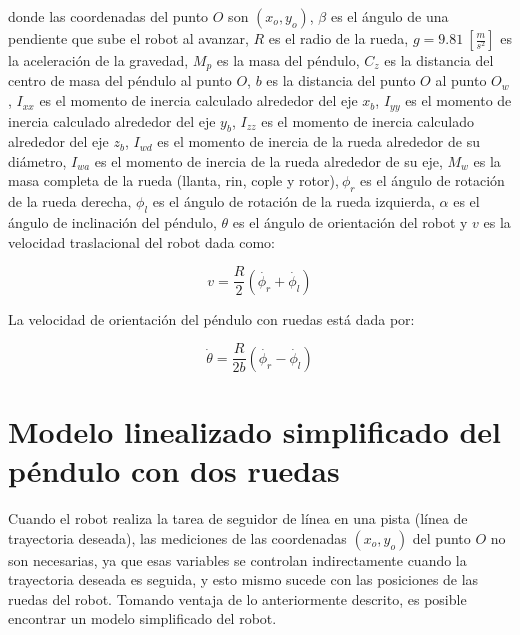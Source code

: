\documentclass[11pt, twoside]{book}     %
\begin{document}
            \noindent donde las coordenadas del punto $O$ son $ (x_o, y_o) $, $ \beta $ es el ángulo de una pendiente que sube el robot al avanzar, $ R $ es el radio de la rueda, $ g = 9.81 \ [\frac{m}{s^2}] $ es la aceleración de la gravedad, $ M_p $ es la masa del péndulo, $ C_z $ es la distancia del centro de masa del péndulo al punto $O$, $ b $ es la distancia del punto $O$ al punto $ O_w $, $ I_{xx} $ es el momento de inercia calculado alrededor del eje $ x_b $, $ I_{yy} $ es el momento de inercia calculado alrededor del eje $ y_b $, $ I_{zz} $ es el momento de inercia calculado alrededor del eje $ z_b $, $ I_{wd} $ es el momento de inercia de la rueda alrededor de su diámetro, $ I_{wa} $ es el momento de inercia de la rueda alrededor de su eje, $ M_w $ es la masa completa de la rueda (llanta, rin, cople y rotor),$ \ \phi_r $ es el ángulo de rotación de la rueda derecha, $ \phi_l $ es el ángulo de rotación de la rueda izquierda, $ \alpha $ es el ángulo de inclinación del péndulo, $ \theta $ es el ángulo de orientación del robot y $ v $ es la velocidad traslacional del robot dada como:

            \begin{equation}
                v= \frac{R}{2}(\dot{\phi_r}+\dot{\phi_l})
            \end{equation}

            La velocidad de orientación del péndulo con ruedas está dada por:

            \begin{equation}
                \dot{\theta}= \frac{R}{2b}(\dot{\phi_r}-\dot{\phi_l})
            \end{equation}
            
        \section{Modelo linealizado simplificado del péndulo con dos ruedas}
                
            Cuando el robot realiza la tarea de seguidor de línea en una pista (línea de trayectoria deseada), las mediciones de las coordenadas $ (x_o, y_o) $ del punto $ O $ no son necesarias, ya que esas variables se controlan indirectamente cuando la trayectoria deseada es seguida, y esto mismo sucede con las posiciones de las ruedas del robot. Tomando ventaja de lo anteriormente descrito, es posible encontrar un modelo simplificado del robot.\\
\end{document}
